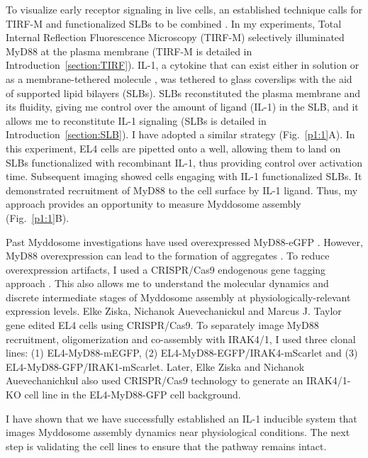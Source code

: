 To visualize early receptor signaling in live cells, an established technique calls for TIRF-M and functionalized SLBs to be combined \autocite{Groves_2003}. In my experiments, Total Internal Reflection Fluorescence Microscopy (TIRF-M) selectively illuminated MyD88 at the plasma membrane (TIRF-M is detailed in Introduction~\ref{section:TIRF}). IL-1, a cytokine that can exist either in solution or as a membrane-tethered molecule \autocite{Bird_1988}, was tethered to glass coverslips with the aid of supported lipid bilayers (SLBs). SLBs reconstituted the plasma membrane and its fluidity, giving me control over the amount of ligand (IL-1) in the SLB, and it allows me to reconstitute IL-1 signaling (SLBs is detailed in Introduction~\ref{section:SLB}). I have adopted a similar strategy (Fig.~\ref{p1:1}A). In this experiment, EL4 cells are pipetted onto a well, allowing them to land on SLBs functionalized with recombinant IL-1, thus providing control over activation time. Subsequent imaging showed cells engaging with IL-1 functionalized SLBs. It demonstrated recruitment of MyD88 to the cell surface by IL-1 ligand. Thus, my approach provides an opportunity to measure Myddosome assembly (Fig.~\ref{p1:1}B).

Past Myddosome investigations have used overexpressed MyD88-eGFP \autocite{Latty_2018}. However, MyD88 overexpression can lead to the formation of aggregates \autocite{Jaunin_1998}\autocite{Nishiya_2007}. To reduce overexpression artifacts, I used a CRISPR/Cas9 endogenous gene tagging approach \autocite{Jaunin_1998}\autocite{Nishiya_2007}. This also allows me to understand the molecular dynamics and discrete intermediate stages of Myddosome assembly at physiologically-relevant expression levels. Elke Ziska, Nichanok Auevechanickul and Marcus J. Taylor gene edited EL4 cells using CRISPR/Cas9. To separately image MyD88 recruitment, oligomerization and co-assembly with IRAK4/1, I used three clonal lines: (1) EL4-MyD88-mEGFP, (2) EL4-MyD88-EGFP/IRAK4-mScarlet and (3) EL4-MyD88-GFP/IRAK1-mScarlet. Later, Elke Ziska and Nichanok Auevechanichkul also used CRISPR/Cas9 technology to generate an IRAK4/1-KO cell line in the EL4-MyD88-GFP cell background.

I have shown that we have successfully established an IL-1 inducible system that images Myddosome assembly dynamics near physiological conditions. The next step is validating the cell lines to ensure that the pathway remains intact.


